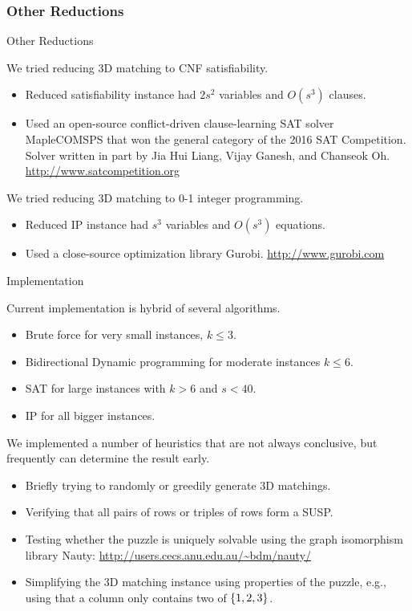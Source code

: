 \documentclass[t,10pt,
mathserif,xcolor=dvipsnames]{beamer}
\begin{document}
\subsubsection{Other Reductions}

\begin{myframe}{Other Reductions}

  We tried reducing 3D matching to CNF satisfiability.
  \begin{itemize}
  \item Reduced satisfiability instance had $2s^2$ variables and
    $O(s^3)$ clauses.
  \item Used an open-source conflict-driven clause-learning SAT solver
    MapleCOMSPS that won the general category of the 2016 SAT
    Competition.  Solver written in part by Jia Hui Liang, Vijay
    Ganesh, and Chanseok Oh.  \\\url{http://www.satcompetition.org}
  \end{itemize}

  \bigskip

  We tried reducing 3D matching to 0-1 integer programming.
  \begin{itemize}
  \item Reduced IP instance had $s^3$ variables and
    $O(s^3)$ equations.
  \item Used a close-source optimization library Gurobi.
    \url{http://www.gurobi.com}
  \end{itemize}
  
\end{myframe}

\begin{myframe}{Implementation}

  Current implementation is hybrid of several algorithms.
  \begin{itemize}
  \item Brute force for very small instances, $k \le3$.
  \item Bidirectional Dynamic programming for moderate instances $k
    \le 6$.
  \item SAT for large instances with $k > 6$ and $s < 40$.
  \item IP for all bigger instances.
  \end{itemize}

  \bigskip

  We implemented a number of heuristics that are not always conclusive,
  but frequently can determine the result early.
  \begin{itemize}
  \item Briefly trying to randomly or greedily generate 3D matchings.
  \item Verifying that all pairs of rows or triples of rows form a SUSP.
  \item Testing whether the puzzle is uniquely solvable using the graph
    isomorphism library Nauty: \url{http://users.cecs.anu.edu.au/~bdm/nauty/}
  \item Simplifying the 3D matching instance using properties of the
    puzzle, e.g., using that a column only contains two of $\{{1,2,3}\}$.
  \end{itemize}
  
\end{myframe}
\end{document}
